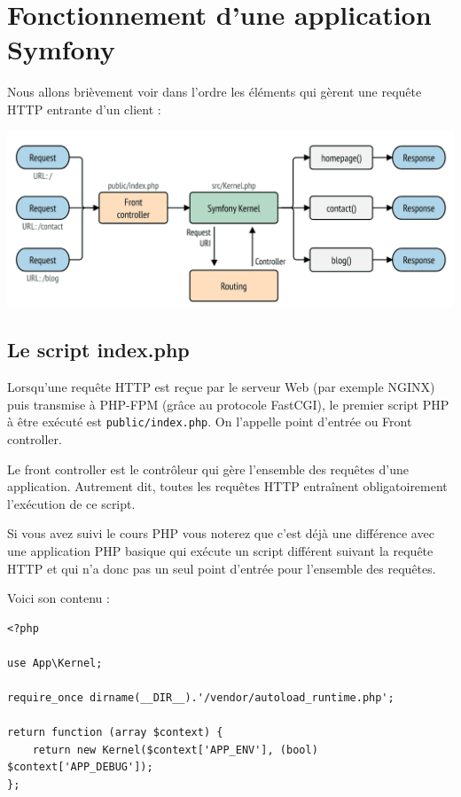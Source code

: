 \documentclass{article}
\begin{document}
\section{Fonctionnement d'une application Symfony}
Nous allons brièvement voir dans l'ordre les éléments qui gèrent une requête HTTP entrante d'un client :
\begin{center}
\includegraphics[width=15cm]{images/image4.png}
\end{center}

\subsection{Le script index.php}
Lorsqu'une requête HTTP est reçue par le serveur Web (par exemple NGINX) puis transmise à PHP-FPM (grâce au protocole FastCGI), le premier script PHP à être exécuté est {\tt public/index.php}. On l'appelle point d'entrée ou Front controller.

Le front controller est le contrôleur qui gère l'ensemble des requêtes d'une application. Autrement dit, toutes les requêtes HTTP entraînent obligatoirement l'exécution de ce script.

Si vous avez suivi le cours PHP vous noterez que c'est déjà une différence avec une application PHP basique qui exécute un script différent suivant la requête HTTP et qui n'a donc pas un seul point d'entrée pour l'ensemble des requêtes.

Voici son contenu :
\begin{verbatim}
<?php

use App\Kernel;

require_once dirname(__DIR__).'/vendor/autoload_runtime.php';

return function (array $context) {
    return new Kernel($context['APP_ENV'], (bool) $context['APP_DEBUG']);
};
\end{verbatim}
\end{document}
